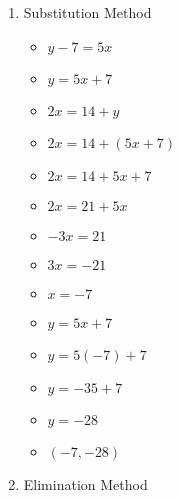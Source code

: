 \begin{enumerate}
\begin{enumerate}
  \item Substitution Method
    \begin{itemize}
    \item $y-7=5x$
    \item $y=5x+7$
    \item $2x=14+y$
    \item $2x=14+(5x+7)$
    \item $2x=14+5x+7$
    \item $2x=21+5x$
    \item $-3x=21$
    \item $3x=-21$
    \item $x=-7$
    \item $y=5x+7$
    \item $y=5(-7)+7$
    \item $y=-35+7$
    \item $y=-28$
    \item $(-7,-28)$
    \end{itemize}
  \item Elimination Method
\end{enumerate}
\end{enumerate}
